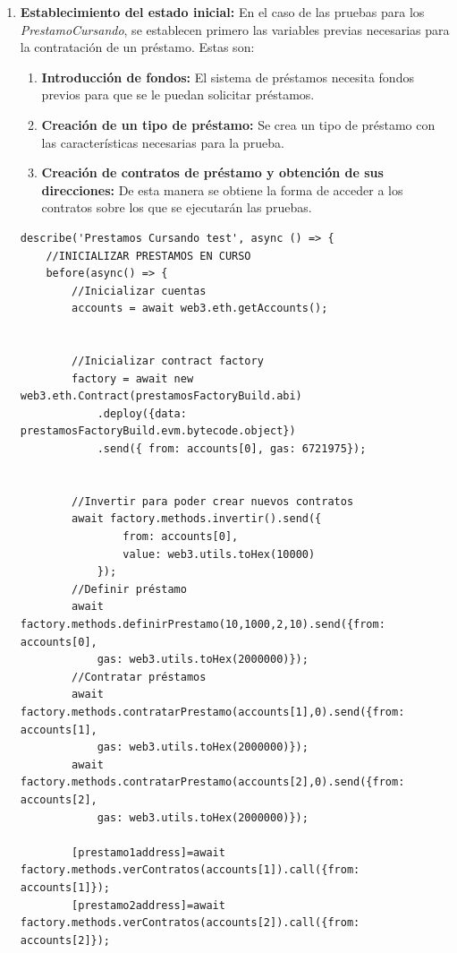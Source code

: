 \begin{enumerate}
    \item \textbf{Establecimiento del estado inicial:} En el caso de las pruebas para
    los \textit{PrestamoCursando}, se establecen primero las variables previas
    necesarias para la contratación de un préstamo.
    Estas son:
    \begin{enumerate}
        \item \textbf{Introducción de fondos:} El sistema de préstamos necesita
        fondos previos para que se le puedan solicitar préstamos.
        \item \textbf{Creación de un tipo de préstamo:} Se crea un tipo de
        préstamo con las características necesarias para la prueba.
        \item \textbf{Creación de contratos de préstamo y obtención de sus
        direcciones:} De esta manera se obtiene la forma de acceder a los
        contratos sobre los que se ejecutarán las pruebas.
    \end{enumerate}
    
\begin{lstlisting}[language=Solidity, caption={Parametrización de préstamos en curso}]
    describe('Prestamos Cursando test', async () => {
    //INICIALIZAR PRESTAMOS EN CURSO
    before(async() => {  
        //Inicializar cuentas
        accounts = await web3.eth.getAccounts();
        
        
        //Inicializar contract factory
        factory = await new web3.eth.Contract(prestamosFactoryBuild.abi)
            .deploy({data: prestamosFactoryBuild.evm.bytecode.object})
            .send({ from: accounts[0], gas: 6721975});
            

        //Invertir para poder crear nuevos contratos
        await factory.methods.invertir().send({
                from: accounts[0],
                value: web3.utils.toHex(10000)
            });
        //Definir préstamo
        await factory.methods.definirPrestamo(10,1000,2,10).send({from: accounts[0],
            gas: web3.utils.toHex(2000000)});
        //Contratar préstamos
        await factory.methods.contratarPrestamo(accounts[1],0).send({from: accounts[1],
            gas: web3.utils.toHex(2000000)});
        await factory.methods.contratarPrestamo(accounts[2],0).send({from: accounts[2],
            gas: web3.utils.toHex(2000000)});

        [prestamo1address]=await factory.methods.verContratos(accounts[1]).call({from: accounts[1]});
        [prestamo2address]=await factory.methods.verContratos(accounts[2]).call({from: accounts[2]});
        

\end{lstlisting}
\end{enumerate}
